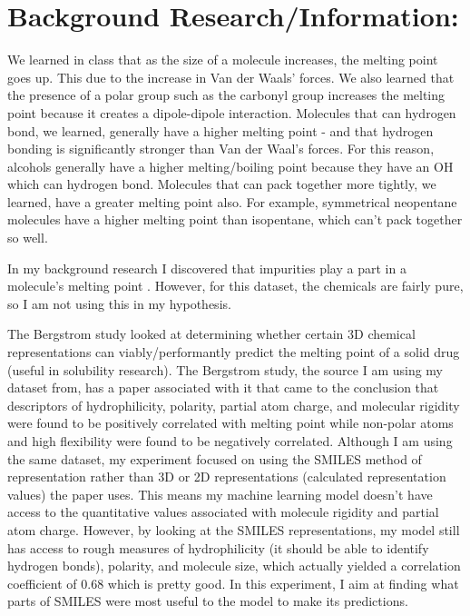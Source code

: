 \documentclass[11pt]{article}
\begin{document}
\section{Background Research/Information:}
\label{sec:org1e19902}
We learned in class that as the size of a molecule increases, the melting point goes up. This due to the increase in Van der Waals' forces.
We also learned that the presence of a polar group such as the carbonyl group increases the melting point because it creates a dipole-dipole interaction.
Molecules that can hydrogen bond, we learned, generally have a higher melting point - and that hydrogen bonding is
significantly stronger than Van der Waal's forces. For this reason, alcohols generally have a higher melting/boiling point because 
they have an OH which can hydrogen bond. Molecules that can pack together more tightly, we learned, have a greater melting point also. 
For example, symmetrical neopentane molecules have a higher melting point than isopentane, which can't pack together so well. 

In my background research I discovered that impurities play a part in a molecule's melting point \cite{sciencing}.
However, for this dataset, the chemicals are fairly pure, so I am not using this in my hypothesis.


The Bergstrom study looked at determining whether certain 3D chemical representations can viably/performantly predict the melting point of a solid drug (useful in solubility research).
The Bergstrom study, the source I am using my dataset from, has a paper \cite{bergstrom} associated with it that came to the conclusion that descriptors of hydrophilicity,
polarity, partial atom charge, and molecular rigidity were found to be positively correlated with melting point while non-polar atoms and high flexibility
were found to be negatively correlated. Although I am using the same dataset, my experiment focused on using the SMILES method
of representation rather than 3D or 2D representations (calculated representation values) the paper uses. This means my machine learning model doesn't have access to the
quantitative values associated with molecule rigidity and partial atom charge. However, by looking at the SMILES representations, my model
still has access to rough measures of hydrophilicity (it should be able to identify hydrogen bonds), polarity, and molecule size, which actually yielded
a correlation coefficient of 0.68 which is pretty good. In this experiment, I aim at finding what parts of SMILES
were most useful to the model to make its predictions.
\end{document}
